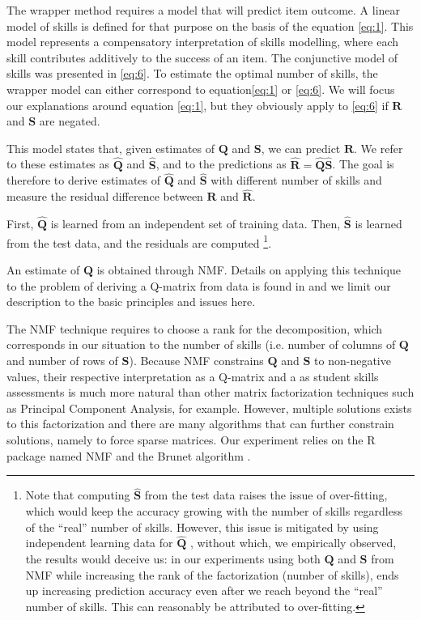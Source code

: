 The wrapper method requires a model that will predict item outcome. A linear model of skills is defined for that purpose on the basis of the equation \ref{eq:1}. This model represents a compensatory interpretation of skills modelling, where each skill contributes additively to the success of an item. The conjunctive model of skills was presented in \ref{eq:6}. To estimate the optimal number of skills, the wrapper model can either correspond to equation\ref{eq:1} or \ref{eq:6}. We will focus our explanations around equation \ref{eq:1}, but they obviously apply to \ref{eq:6} if $\mathbf{R}$ and $\mathbf{S}$ are negated.

This model states that, given estimates of $\mathbf{Q}$ and $\mathbf{S}$, we can predict $\mathbf{R}$. We refer to these estimates as $\hat{\mathbf{Q}}$ and $\hat{\mathbf{S}}$, and to the predictions as $\hat{\mathbf{R}}=\hat{\mathbf{Q}}\hat{\mathbf{S}}$. The goal is therefore to derive estimates of $\hat{\mathbf{Q}}$ and $\hat{\mathbf{S}}$ with different number of skills and measure the residual difference between $\mathbf{R}$ and $\hat{\mathbf{R}}$. 

First, $\hat{\mathbf{Q}}$ is learned from an independent set of training data. Then, $\hat{\mathbf{S}}$ is learned from the test data, and the residuals are computed%
\footnote{Note that computing $\hat{\mathbf{S}}$ from the test data raises the issue of over-fitting, which would keep the accuracy growing with the number of skills regardless of the \textquotedblleft{}real\textquotedblright{} number of skills. However, this issue is mitigated by using independent learning data for $\hat{\mathbf{Q}}$ , without which, we empirically observed, the results would deceive us: in our experiments using both $\mathbf{Q}$ and $\mathbf{S}$ from NMF while increasing the rank of the factorization (number of skills), ends up increasing prediction accuracy even after we reach beyond the \textquotedblleft{}real\textquotedblright{} number of skills. This can reasonably be attributed to over-fitting. %
}.

An estimate of $\hat{\mathbf{Q}}$ is obtained through NMF. Details on applying this technique to the problem of deriving a Q-matrix from data is found in \citep{desmarais2011conditions} and we limit our description to the basic principles and issues here.

The NMF technique requires to choose a rank for the decomposition, which corresponds in our situation to the number of skills (i.e. number of columns of $\mathbf{Q}$ and number of rows of $\mathbf{S}$). Because NMF constrains $\mathbf{Q}$ and $\mathbf{S}$ to non-negative values, their respective interpretation as a Q-matrix and a as student skills assessments is much more natural than other matrix factorization techniques such as Principal Component Analysis, for example. However, multiple solutions exists to this factorization and there are many algorithms that can further constrain solutions, namely to force sparse matrices. Our experiment relies on the R package named NMF and the Brunet algorithm \citep{Gaujoux2010}.

